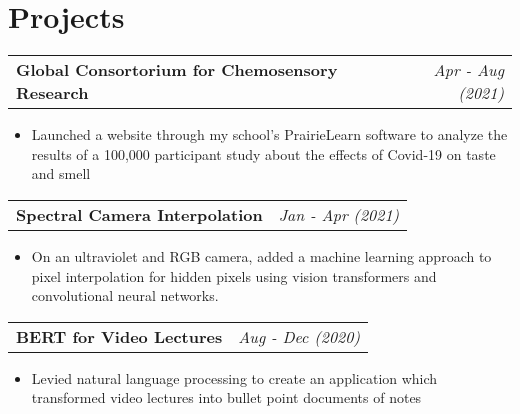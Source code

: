 \documentclass[letterpaper,11pt]{article}
\makeatletter
\newcommand{\projectItem}[1]{
  \item\small{
    {#1 \vspace{-2pt}}
  }
}
\newcommand{\projectSubheading}[2]{
  \vspace{-1pt}\item
    \begin{tabular*}{0.97\textwidth}{l@{\extracolsep{\fill}}r}
      \textbf{#1} & \textit{#2}
    \end{tabular*}\vspace{-5pt}
}
\newcommand{\projectSubHeadingListStart}{\begin{description}[leftmargin=-2mm]}
\newcommand{\projectSubHeadingListEnd}{\end{description}}
\newcommand{\projectItemListStart}{\begin{itemize}[rightmargin=14mm]}
\newcommand{\projectItemListEnd}{\end{itemize}\vspace{-5pt}}
\makeatother
\begin{document}
\section{Projects}
  \projectSubHeadingListStart
    \renewcommand\labelitemi{}
    \projectSubheading
      {Global Consortorium for Chemosensory Research}{Apr - Aug (2021)}
        \projectItemListStart
            \projectItem 
              {Launched a website through my school's PrairieLearn software to analyze the results of a 100,000 participant study about the effects of Covid-19 on taste and smell}
        \projectItemListEnd
    \projectSubheading
        {Spectral Camera Interpolation}{Jan - Apr (2021)}
        \projectItemListStart
            \projectItem
            {On an ultraviolet and RGB camera, added a machine learning approach to pixel interpolation for hidden pixels using vision transformers and convolutional neural networks.}
        \projectItemListEnd
    \projectSubheading
      {BERT for Video Lectures}{Aug - Dec (2020)}
      \projectItemListStart
            \projectItem
            {Levied natural language processing to create an application which transformed video lectures into bullet point documents of notes}
        \projectItemListEnd

  \projectSubHeadingListEnd
 
\printbibliography[title=Publications]


\end{document}
